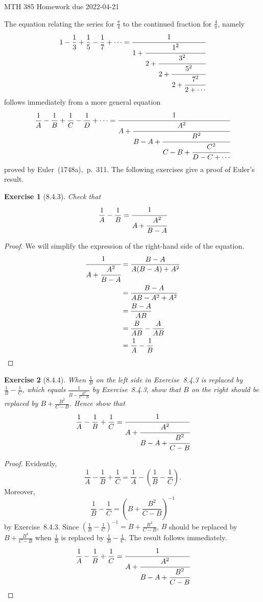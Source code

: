 \documentclass[12pt]{article}
\theoremstyle{plain}
\newtheorem{ex}{Exercise}
\begin{document}
MTH 385 \qquad Homework due 2022-04-21

The equation relating the series for $\frac{\pi}{4}$ to the continued fraction for $\frac{4}{\pi}$, namely
\[
  1-\frac{1}{3}+\frac{1}{5}-\frac{1}{7}+\cdots=\cfrac{1}{1+\cfrac{1^2}{2+\cfrac{3^2}{2+\cfrac{5^2}{2+\cfrac{7^2}{2+\cdots}}}}}
\]
follows immediately from a more general equation
\[
  \frac{1}{A}-\frac{1}{B}+\frac{1}{C}-\frac{1}{D}+\cdots=\cfrac{1}{A+\cfrac{A^2}{B-A+\cfrac{B^2}{C-B+\cfrac{C^2}{D-C+\cdots}}}}
\]
proved by Euler~(1748a),~p.~311. The following exercises give a proof of Euler's result.

\begin{ex} [8.4.3]
  Check that
  \[
    \frac{1}{A}-\frac{1}{B}=\cfrac{1}{A+\cfrac{A^2}{B-A}}
  \]
\end{ex}

\begin{proof}
  We will simplify the expression of the right-hand side of the equation.
  \begin{align*}
    \cfrac{1}{A+\cfrac{A^2}{B-A}} &= \frac{B-A}{A(B-A)+A^2} \\
    &= \frac{B-A}{AB-A^2+A^2} \\
    &= \frac{B-A}{AB} \\
    &= \frac{B}{AB}-\frac{A}{AB} \\
    &= \frac{1}{A}-\frac{1}{B}
  \end{align*}
\end{proof}

\begin{ex} [8.4.4]
  When $\frac{1}{B}$ on the left side in Exercise~8.4.3 is replaced by $\frac{1}{B}-\frac{1}{C}$, which equals $\frac{1}{B-\frac{B^2}{C-B}}$ by Exercise~8.4.3, show that $B$ on the right should be replaced by $B+\frac{B^2}{C-B}$. Hence show that
  \[
    \frac{1}{A}-\frac{1}{B}+\frac{1}{C}=\cfrac{1}{A+\cfrac{A^2}{B-A+\cfrac{B^2}{C-B}}}
  \]
\end{ex}

\begin{proof}
  Evidently,
  \[
    \frac{1}{A}-\frac{1}{B}+\frac{1}{C}=\frac{1}{A}-\left(\frac{1}{B}-\frac{1}{C}\right).
  \]
  Moreover,
  \[
    \frac{1}{B}-\frac{1}{C}=\left(B+\frac{B^2}{C-B}\right)^{-1}
  \]
  by Exercise~8.4.3. Since $\left(\frac{1}{B}-\frac{1}{C}\right)^{-1}=B+\frac{B^2}{C-B}$,  $B$ should be replaced by $B+\frac{B^2}{C-B}$ when $\frac{1}{B}$ is replaced by $\frac{1}{B}-\frac{1}{C}$. The result follows immediately.
  \[
    \frac{1}{A}-\frac{1}{B}+\frac{1}{C}=\cfrac{1}{A+\cfrac{A^2}{B-A+\cfrac{B^2}{C-B}}}
  \]
\end{proof}
\end{document}
